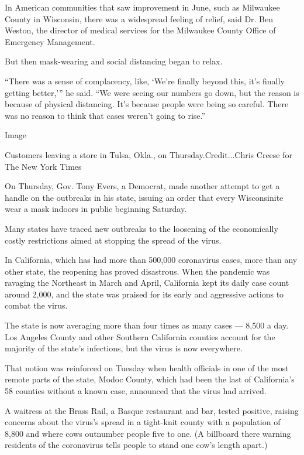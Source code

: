 In American communities that saw improvement in June, such as Milwaukee
County in Wisconsin, there was a widespread feeling of relief, said Dr.
Ben Weston, the director of medical services for the Milwaukee County
Office of Emergency Management.

But then mask-wearing and social distancing began to relax.

``There was a sense of complacency, like, `We're finally beyond this,
it's finally getting better,''' he said. ``We were seeing our numbers go
down, but the reason is because of physical distancing. It's because
people were being so careful. There was no reason to think that cases
weren't going to rise.''

Image

Customers leaving a store in Tulsa, Okla., on Thursday.Credit...Chris
Creese for The New York Times

On Thursday, Gov. Tony Evers, a Democrat, made another attempt to get a
handle on the outbreaks in his state, issuing an order that every
Wisconsinite wear a mask indoors in public beginning Saturday.

Many states have traced new outbreaks to the loosening of the
economically costly restrictions aimed at stopping the spread of the
virus.

In California, which has had more than 500,000 coronavirus cases, more
than any other state, the reopening has proved disastrous. When the
pandemic was ravaging the Northeast in March and April, California kept
its daily case count around 2,000, and the state was praised for its
early and aggressive actions to combat the virus.

The state is now averaging more than four times as many cases --- 8,500
a day. Los Angeles County and other Southern California counties account
for the majority of the state's infections, but the virus is now
everywhere.

That notion was reinforced on Tuesday when health officials in one of
the most remote parts of the state, Modoc County, which had been the
last of California's 58 counties without a known case, announced that
the virus had arrived.

A waitress at the Brass Rail, a Basque restaurant and bar, tested
positive, raising concerns about the virus's spread in a tight-knit
county with a population of 8,800 and where cows outnumber people five
to one. (A billboard there warning residents of the coronavirus tells
people to stand one cow's length apart.)

